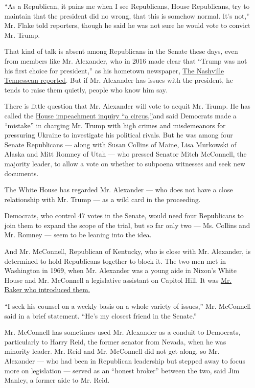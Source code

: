 ``As a Republican, it pains me when I see Republicans, House
Republicans, try to maintain that the president did no wrong, that this
is somehow normal. It's not,'' Mr. Flake told reporters, though he said
he was not sure he would vote to convict Mr. Trump.

That kind of talk is absent among Republicans in the Senate these days,
even from members like Mr. Alexander, who in 2016 made clear that
``Trump was not his first choice for president,'' as his hometown
newspaper,
\href{https://www.tennessean.com/story/news/politics/2016/05/04/delegation-members-begin-lining-up-behind-donald-trump/83921758/}{The
Nashville Tennessean reported}. But if Mr. Alexander has issues with the
president, he tends to raise them quietly, people who know him say.

There is little question that Mr. Alexander will vote to acquit Mr.
Trump. He has called the
\href{https://twitter.com/SenAlexander/status/1217894177133998081}{House
impeachment inquiry ``a circus,''}and said Democrats made a ``mistake''
in charging Mr. Trump with high crimes and misdemeanors for pressuring
Ukraine to investigate his political rivals. But he was among four
Senate Republicans --- along with Susan Collins of Maine, Lisa Murkowski
of Alaska and Mitt Romney of Utah --- who pressed Senator Mitch
McConnell, the majority leader, to allow a vote on whether to subpoena
witnesses and seek new documents.

The White House has regarded Mr. Alexander --- who does not have a close
relationship with Mr. Trump --- as a wild card in the proceeding.

Democrats, who control 47 votes in the Senate, would need four
Republicans to join them to expand the scope of the trial, but so far
only two --- Ms. Collins and Mr. Romney --- seem to be leaning into the
idea.

And Mr. McConnell, Republican of Kentucky, who is close with Mr.
Alexander, is determined to hold Republicans together to block it. The
two men met in Washington in 1969, when Mr. Alexander was a young aide
in Nixon's White House and Mr. McConnell a legislative assistant on
Capitol Hill. It was
\href{https://www.nytimes3xbfgragh.onion/2017/10/19/us/politics/mcconnell-alexander-health-care.html}{Mr.
Baker who introduced them.}

``I seek his counsel on a weekly basis on a whole variety of issues,''
Mr. McConnell said in a brief statement. ``He's my closest friend in the
Senate.''

Mr. McConnell has sometimes used Mr. Alexander as a conduit to
Democrats, particularly to Harry Reid, the former senator from Nevada,
when he was minority leader. Mr. Reid and Mr. McConnell did not get
along, so Mr. Alexander --- who had been in Republican leadership but
stepped away to focus more on legislation --- served as an ``honest
broker'' between the two, said Jim Manley, a former aide to Mr. Reid.

